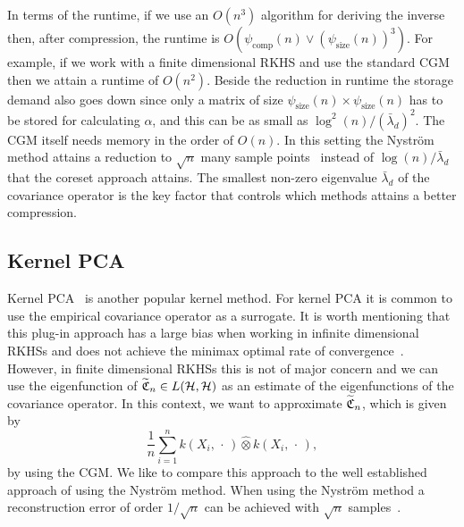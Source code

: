 \documentclass[10pt]{amsart}
\theoremstyle{definition}\newtheorem{defi}[theo]{Definition}\newtheorem{rema}[theo]{Remark}\newtheorem{exam}[theo]{Example}\newtheorem{exem}[theo]{Example}\newtheorem{nota}[theo]{Notation}
\theoremstyle{remark}
\newcommand{\compp}{\mathrm{comp}}
\newcommand{\ssize}{\mathrm{size}}
\newcommand{\cH}{\mathcal{H}}
\newcommand{\fkC}{\mathfrak{C}}
\newcommand{\wh}{\widehat}
\let\oldtilde\tilde
\renewcommand*{\tilde}[1]{\mathchoice{\widetilde{#1}}{\widetilde{#1}}{\oldtilde{#1}}{\oldtilde{#1}}}
\begin{document}
In terms of the runtime, if we use an $O(n^3)$ algorithm for deriving the inverse then, after compression, the runtime is $O(\psi_{\compp}(n) \vee (\psi_{\ssize}(n))^3)$. For example, if we work with a finite dimensional RKHS and use the standard CGM then we attain a runtime of $O(n^2)$. Beside the reduction in runtime the storage demand also goes down since only a matrix of size $\psi_{\ssize}(n) \times \psi_{\ssize}(n)$ has to be stored for calculating $\alpha$, and this can be as small as $\log^2(n) /(\bar \lambda_d)^2$. The CGM itself needs memory in the order of $O(n)$. In this setting the Nystr\"om method attains a reduction to $\sqrt{n}$ many sample points~\cite[Theorem~3.9]{LI23} instead of $\log(n)/\bar \lambda_d$ that the coreset approach attains. The smallest non-zero eigenvalue $\bar \lambda_d$ of the covariance operator is the key factor that controls which methods attains a better compression.

\subsection{Kernel PCA}

Kernel PCA~\cite{SCH97,BLAN07} is another popular kernel method. For kernel PCA it is common to use the empirical covariance operator as a surrogate. It is worth mentioning that this plug-in approach has a large bias when working in infinite dimensional RKHSs and does not achieve the minimax optimal rate of convergence~\cite{KOLT18}. However, in finite dimensional RKHSs this is not of major concern and we can use the eigenfunction of $\tilde{\fkC}_n \in L(\cH,\cH)$ as an estimate of the eigenfunctions of the covariance operator. In this context, we want to approximate $\tilde{\fkC}_n$, which is given by
\[
\frac{1}{n} \sum_{i=1}^n k(X_i,\,\cdot\,) \wh{\otimes} k(X_i,\,\cdot\,),
\]
by using the CGM. We like to compare this approach to the well established approach of using the Nystr\"om method. When using the Nystr\"om method a reconstruction error of order $1/\sqrt{n}$ can be achieved with $\sqrt{n}$ samples~\cite[Corollary~3]{STER20}.
\end{document}
